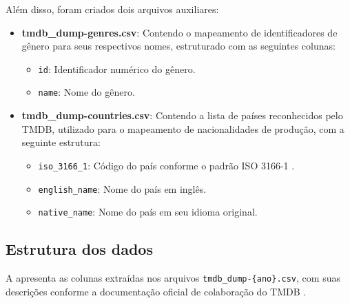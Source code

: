 Além disso, foram criados dois arquivos auxiliares:
\begin{itemize}
    \item \textbf{tmdb\_dump-genres.csv}: Contendo o mapeamento de identificadores de gênero para seus respectivos nomes, estruturado com as seguintes colunas:
    \begin{itemize}
        \item \texttt{id}: Identificador numérico do gênero.
        \item \texttt{name}: Nome do gênero.
    \end{itemize}
    \item \textbf{tmdb\_dump-countries.csv}: Contendo a lista de países reconhecidos pelo \acrshort{TMDB}, utilizado para o mapeamento de nacionalidades de produção, com a seguinte estrutura:
    \begin{itemize}
        \item \texttt{iso\_3166\_1}: Código do país conforme o padrão ISO 3166-1 \cite{iso3166-1}.
        \item \texttt{english\_name}: Nome do país em inglês.
        \item \texttt{native\_name}: Nome do país em seu idioma original.
    \end{itemize}
\end{itemize}

\subsection{Estrutura dos dados}
A  apresenta as colunas extraídas nos arquivos  \texttt{tmdb\_dump-\{ano\}.csv}, com suas descrições conforme a documentação oficial de colaboração do \acrshort{TMDB} \cite{tmdb_bible}.

